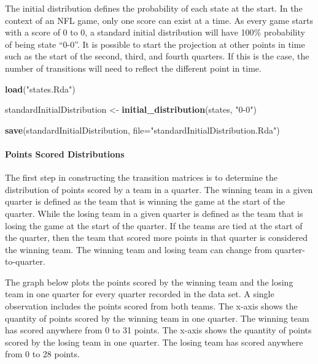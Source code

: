 \documentclass[
]{article}
\newenvironment{Shaded}{\begin{snugshade}}{\end{snugshade}}
\newcommand{\DataTypeTok}[1]{\textcolor[rgb]{0.13,0.29,0.53}{#1}}
\newcommand{\KeywordTok}[1]{\textcolor[rgb]{0.13,0.29,0.53}{\textbf{#1}}}
\newcommand{\NormalTok}[1]{#1}
\newcommand{\StringTok}[1]{\textcolor[rgb]{0.31,0.60,0.02}{#1}}
\let\oldparagraph\paragraph
\renewcommand{\paragraph}[1]{\oldparagraph{#1}\mbox{}}
\begin{document}
The initial distribution defines the probability of each state at the
start. In the context of an NFL game, only one score can exist at a
time. As every game starts with a score of 0 to 0, a standard initial
distribution will have 100\% probability of being state ``0-0''. It is
possible to start the projection at other points in time such as the
start of the second, third, and fourth quarters. If this is the case,
the number of transitions will need to reflect the different point in
time.

\begin{Shaded}
\begin{Highlighting}[]
\KeywordTok{load}\NormalTok{(}\StringTok{"states.Rda"}\NormalTok{)}

\NormalTok{standardInitialDistribution <-}\StringTok{ }\KeywordTok{initial_distribution}\NormalTok{(states, }\StringTok{"0-0"}\NormalTok{)}

\KeywordTok{save}\NormalTok{(standardInitialDistribution, }\DataTypeTok{file=}\StringTok{"standardInitialDistribution.Rda"}\NormalTok{)}
\end{Highlighting}
\end{Shaded}

\hypertarget{points-scored-distributions}{%
\paragraph{Points Scored
Distributions}\label{points-scored-distributions}}

The first step in constructing the transition matrices is to determine
the distribution of points scored by a team in a quarter. The winning
team in a given quarter is defined as the team that is winning the game
at the start of the quarter. While the losing team in a given quarter is
defined as the team that is losing the game at the start of the quarter.
If the teams are tied at the start of the quarter, then the team that
scored more points in that quarter is considered the winning team. The
winning team and losing team can change from quarter-to-quarter.

The graph below plots the points scored by the winning team and the
losing team in one quarter for every quarter recorded in the data set. A
single observation includes the points scored from both teams. The
x-axis shows the quantity of points scored by the winning team in one
quarter. The winning team has scored anywhere from 0 to 31 points. The
x-axis shows the quantity of points scored by the losing team in one
quarter. The losing team has scored anywhere from 0 to 28 points.
\end{document}
